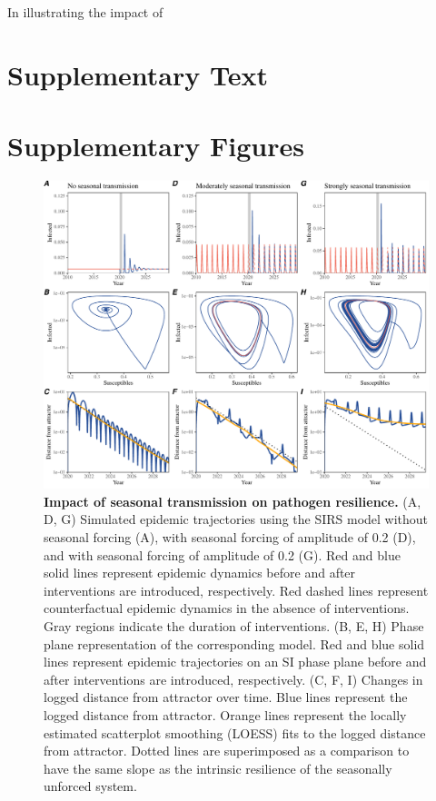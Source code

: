 \documentclass[12pt]{article}
\begin{document}
In illustrating the impact of 

\pagebreak

\section*{Supplementary Text}

\pagebreak

\setcounter{figure}{0}
\setcounter{equation}{0}
\renewcommand{\thefigure}{S\arabic{figure}}
\renewcommand{\theequation}{S\arabic{equation}}

\section*{Supplementary Figures}

\begin{figure}[!th]
\includegraphics[width=\textwidth]{../figure2/figure2_simple_seas.pdf}
\caption{
\textbf{Impact of seasonal transmission on pathogen resilience.}
(A, D, G) Simulated epidemic trajectories using the SIRS model without seasonal forcing (A), with seasonal forcing of amplitude of 0.2 (D), and with seasonal forcing of amplitude of 0.2 (G).
Red and blue solid lines represent epidemic dynamics before and after interventions are introduced, respectively.
Red dashed lines represent counterfactual epidemic dynamics in the absence of interventions.
Gray regions indicate the duration of interventions.
(B, E, H) Phase plane representation of the corresponding model.
Red and blue solid lines represent epidemic trajectories on an SI phase plane before and after interventions are introduced, respectively.
(C, F, I) Changes in logged distance from attractor over time.
Blue lines represent the logged distance from attractor.
Orange lines represent the locally estimated scatterplot smoothing (LOESS) fits to the logged distance from attractor.
Dotted lines are superimposed as a comparison to have the same slope as the intrinsic resilience of the seasonally unforced system.
}
\end{figure}
\end{document}
